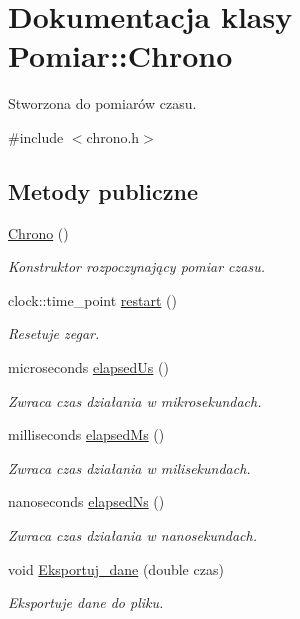\hypertarget{class_pomiar_1_1_chrono}{\section{\-Dokumentacja klasy \-Pomiar\-:\-:\-Chrono}
\label{class_pomiar_1_1_chrono}
}


\-Stworzona do pomiarów czasu.  




{\ttfamily \#include $<$chrono.\-h$>$}

\subsection*{\-Metody publiczne}
\begin{DoxyCompactItemize}
\item 
\hyperlink{class_pomiar_1_1_chrono_a2abf3698fb974851c874747006bc1704}{\-Chrono} ()
\begin{DoxyCompactList}\small\item\em \-Konstruktor rozpoczynający pomiar czasu. \end{DoxyCompactList}\item 
clock\-::time\-\_\-point \hyperlink{class_pomiar_1_1_chrono_aa21c2b5c1e13e8f004af76472b0e81fc}{restart} ()
\begin{DoxyCompactList}\small\item\em \-Resetuje zegar. \end{DoxyCompactList}\item 
microseconds \hyperlink{class_pomiar_1_1_chrono_a58f1b51571c6ce87d173639ff03f3664}{elapsed\-Us} ()
\begin{DoxyCompactList}\small\item\em \-Zwraca czas działania w mikrosekundach. \end{DoxyCompactList}\item 
milliseconds \hyperlink{class_pomiar_1_1_chrono_a5f52e691a6319f46ee7db3bd5263541a}{elapsed\-Ms} ()
\begin{DoxyCompactList}\small\item\em \-Zwraca czas działania w milisekundach. \end{DoxyCompactList}\item 
nanoseconds \hyperlink{class_pomiar_1_1_chrono_ae0c2f8399cce3432c979a405ba0a7cc0}{elapsed\-Ns} ()
\begin{DoxyCompactList}\small\item\em \-Zwraca czas działania w nanosekundach. \end{DoxyCompactList}\item 
void \hyperlink{class_pomiar_1_1_chrono_a0d2a729f4887e8a1eae57007908baf23}{\-Eksportuj\-\_\-dane} (double czas)
\begin{DoxyCompactList}\small\item\em \-Eksportuje dane do pliku. \end{DoxyCompactList}\end{DoxyCompactItemize}


